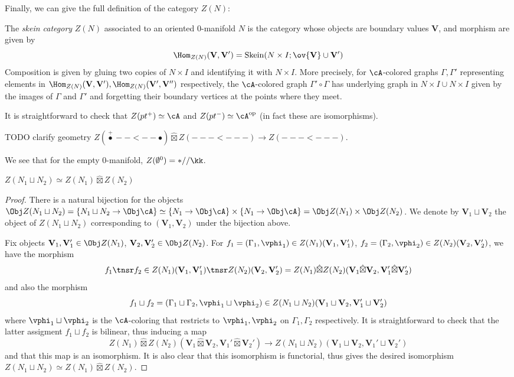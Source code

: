 \documentclass[12pt]{article}
\newcommand{\empt}[1]{{\emptyset^{#1}}}
\newcommand{\VV}{{\mathbf{V}}}
\DeclareMathOperator{\Skein}{Skein}
\newcommand{\op}{{\text{op}}}
\newcommand{\hatbox}{{\hat{\boxtimes}}}
\begin{document}
Finally, we can give the full definition of the category
$Z(N)$:

\begin{definition}
\label{d:skein-category}
The \emph{skein category} $Z(N)$ associated to an
oriented 0-manifold $N$
is the category whose objects are boundary values $\VV$,
and morphism are given by
\[
\Hom_{Z(N)}(\VV,\VV') = \Skein(N \times I; \ov{\VV} \cup \VV')
\]
Composition is given by gluing two copies of $N \times I$
and identifying it with $N \times I$.
More precisely, for $\cA$-colored graphs $\Gamma,\Gamma'$
representing elements in
$\Hom_{Z(N)}(\VV,\VV'), \Hom_{Z(N)}(\VV',\VV'')$
respectively,
the $\cA$-colored graph $\Gamma' \circ \Gamma$
has underlying graph in $N \times I \cup N \times I$
given by the images of $\Gamma$ and $\Gamma'$
and forgetting their boundary vertices
at the points where they meet.
\end{definition}

It is straightforward to check that
$Z(pt^+) \simeq \cA$
and $Z(pt^-) \simeq \cA^\op$
(in fact these are isomorphisms).

TODO clarify geometry $Z(\overset{+}{\bullet} --<-- \bullet) \hatbox Z(---<---)
\to Z(---<---)$.

We see that for the empty 0-manifold, $Z(\empt{0}) = *//\kk$.



\begin{proposition}
$Z(N_1 \sqcup N_2) \simeq Z(N_1) \hatbox Z(N_2)$
\end{proposition}

\begin{proof}
There is a natural bijection for the objects
$\Obj Z(N_1 \sqcup N_2) = \{N_1 \sqcup N_2 \to \Obj \cA\}
\simeq \{N_1 \to \Obj \cA\} \times \{N_1 \to \Obj \cA\}
= \Obj Z(N_1) \times \Obj Z(N_2)$.
We denote by $\VV_1 \sqcup \VV_2$ the object of $Z(N_1 \sqcup N_2)$
corresponding to $(\VV_1,\VV_2)$ under the bijection above.

Fix objects $\VV_1,\VV_1' \in \Obj Z(N_1)$,
$\VV_2,\VV_2' \in \Obj Z(N_2)$.
For $f_1 = (\Gamma_1,\vphi_1) \in Z(N_1)(\VV_1,\VV_1')$,
$f_2 = (\Gamma_2,\vphi_2) \in Z(N_2)(\VV_2,\VV_2')$,
we have the morphism
\[
f_1 \tnsr f_2 \in
Z(N_1)(\VV_1,\VV_1') \tnsr Z(N_2)(\VV_2,\VV_2')
= Z(N_1) \hatbox Z(N_2)(\VV_1 \hatbox \VV_2, \VV_1' \hatbox \VV_2')
\]
and also the morphism
\[
f_1 \sqcup f_2 = (\Gamma_1 \sqcup \Gamma_2, \vphi_1 \sqcup \vphi_2)
\in Z(N_1 \sqcup N_2) (\VV_1 \sqcup \VV_2, \VV_1' \sqcup \VV_2')
\]
where $\vphi_1 \sqcup \vphi_2$ is the $\cA$-coloring that
restricts to $\vphi_1,\vphi_2$ on $\Gamma_1,\Gamma_2$ respectively.
It is straightforward to check that
the latter assigment $f_1 \sqcup f_2$ is bilinear,
thus inducing a map
\[
Z(N_1) \hatbox Z(N_2)(\VV_1 \hatbox \VV_2, \VV_1' \hatbox \VV_2')
\to Z(N_1 \sqcup N_2) (\VV_1 \sqcup \VV_2, \VV_1' \sqcup \VV_2')
\]
and that this map is an isomorphism.
It is also clear that this isomorphism is functorial,
thus gives the desired isomorphism
$Z(N_1 \sqcup N_2) \simeq Z(N_1) \hatbox Z(N_2)$.
\end{proof}
\end{document}
